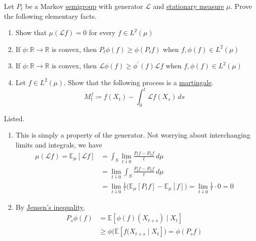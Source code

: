   \begin{exercise}
  Let $P_t$ be a Markov \hyperref[alg-def:semigroup]{semigroup} with generator $\mathscr{L}$ and \hyperref[def:stationary-measure]{stationary measure} $\mu$. Prove the following elementary facts. 
  \begin{enumerate}
      \item Show that $\mu( \mathscr{L} f) = 0$ for every $f \in L^2 (\mu)$ 
      \item If $\phi : \mathbb{R} \rightarrow \mathbb{R}$ is convex, then $P_t \phi (f) \geq \phi (P_t f)$ when $f, \phi(f) \in L^2(\mu)$ 
      \item If $\phi : \mathbb{R} \rightarrow \mathbb{R}$ is convex, then $\mathscr{L} \phi(f) \geq \phi^\prime (f) \mathscr{L} f$ when $f, \phi(f) \in L^2 (\mu)$ 
      \item Let $f \in L^2 (\mu)$. Show that the following process is a \hyperref[sp-def:martingale]{martingale}. 
      \begin{equation}
        M_t^f \coloneqq f(X_t) - \int_0^t \mathscr{L} f(X_s) \,ds
      \end{equation}
  \end{enumerate}
  \end{exercise}
  \begin{solution}
  Listed. 
  \begin{enumerate}
      \item This is simply a property of the generator. Not worrying about interchanging limits and integrals, we have 
      \begin{align*}
          \mu(\mathscr{L} f) = \mathbb{E}_\mu [\mathscr{L} f] & = \int_S \lim_{t \downarrow 0} \frac{P_t f - P_0 f}{t} \,d\mu \\ 
          & = \lim_{t \downarrow 0} \int_S \frac{P_t f - P_0 f}{t} \,d\mu \\
          & = \lim_{t \downarrow 0} \frac{1}{t} \big( \mathbb{E}_\mu [P_t f] - \mathbb{E}_\mu [f] \big) = \lim_{t \downarrow 0} \frac{1}{t} \cdot 0 = 0 
      \end{align*}
      
      \item By \hyperref[thm:jensens-inequality]{Jensen's inequality}, 
      \begin{align*}
          P_s \phi(f) & = \mathbb{E} [ \phi(f) (X_{t + s}) \mid X_t] \\
          & \geq \phi \bigg( \mathbb{E}[f(X_{t + s} \mid X_t] \big) = \phi(P_s f)
      \end{align*}

  \end{enumerate}
  \end{solution}


